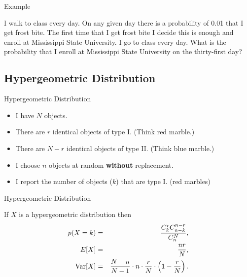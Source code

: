 \begin{frame}{Example}

  I walk to class every day. On any given day there is a probability
  of 0.01 that I get frost bite. The first time that I get frost bite
  I decide this is enough and enroll at Mississippi State
  University. I go to class every day. What is the probability that I
  enroll at Mississippi State University on the thirty-first day?

\end{frame}

\subsection{Hypergeometric Distribution}

\begin{frame}{Hypergeometric Distribution}

  \begin{itemize}
  \item I have $N$ objects.
  \item There are $r$ identical objects of type I. (Think red marble.)
  \item There are $N-r$ identical objects of type II. (Think blue  marble.)
  \item I choose $n$ objects at random \textbf{without} replacement.
  \item I report the number of objects ($k$) that are type I. (red marbles)
  \end{itemize}

  \vfill


\end{frame}

\begin{frame}{Hypergeometric Distribution}


  \begin{definition}
    If $X$ is a hypergeometric distribution then
    \begin{eqnarray*}
      p(X=k) & = & \frac{C^r_k C^{n-r}_{n-k}}{C^N_n}, \\
      E[X] & = & \frac{nr}{N}, \\
      \mathrm{Var}[X] & = & \frac{N-n}{N-1} \cdot n \cdot \frac{r}{N} \cdot \left( 1-\frac{r}{N}\right).
    \end{eqnarray*}
  \end{definition}

\end{frame}


